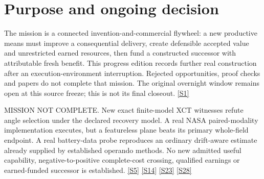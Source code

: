 \documentclass[11pt,letterpaper]{article}
\begin{document}
\section{Purpose and ongoing decision}
The mission is a connected invention-and-commercial flywheel: a new productive means must improve a consequential delivery, create defensible accepted value and unrestricted earned resources, then fund a constructed successor with attributable fresh benefit. This progress edition records further real construction after an execution-environment interruption. Rejected opportunities, proof checks and papers do not complete that mission. The original overnight window remains open at this source freeze; this is not its final closeout. \href{https://github.com/MontrealAI/AGI-Alpha-Invention-Flywheel-Lab/blob/2b7a58e6e6593ae48da6f7f33865db94868c957f/campaign/overnight-008/ALLOCATION.json}{[S1]}\par
MISSION NOT COMPLETE. New exact finite-model XCT witnesses refute angle selection under the declared recovery model. A real NASA paired-modality implementation executes, but a featureless plane beats its primary whole-field endpoint. A real battery-data probe reproduces an ordinary drift-aware estimate already supplied by established operando methods. No new admitted useful capability, negative-to-positive complete-cost crossing, qualified earnings or earned-funded successor is established. \href{https://github.com/MontrealAI/AGI-Alpha-Invention-Flywheel-Lab/blob/2b7a58e6e6593ae48da6f7f33865db94868c957f/evidence/overnight-008/xct-recovery/xct-fraction-r2-bound/artifacts/REPORT.json}{[S5]} \href{https://github.com/MontrealAI/AGI-Alpha-Invention-Flywheel-Lab/blob/2b7a58e6e6593ae48da6f7f33865db94868c957f/research/nasa008/development/PLANE_COMPARATOR.json}{[S14]} \href{https://github.com/MontrealAI/AGI-Alpha-Invention-Flywheel-Lab/blob/2b7a58e6e6593ae48da6f7f33865db94868c957f/research/eis008/development/run-r2/REPORT.json}{[S23]} \href{https://github.com/MontrealAI/AGI-Alpha-Invention-Flywheel-Lab/blob/2b7a58e6e6593ae48da6f7f33865db94868c957f/campaign/overnight-008/economics/recovery/run008/CUMULATIVE_COST_RESOURCE.json}{[S28]}\par
\end{document}
